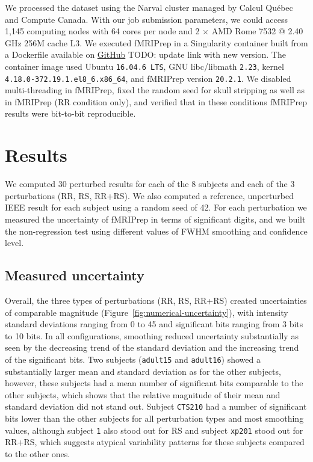 \documentclass{article}
\newcommand{\TODO}[1]{\color{red}\textsc{TODO:} #1\color{black}\xspace}
\newcommand{\fmriprep}{fMRIPrep \xspace}
\begin{document}
We processed the dataset using the Narval cluster managed by Calcul Qu\'ebec and
Compute Canada. With our job submission parameters, we could access 1,145
computing nodes with 64 cores per node and 2 $\times$ AMD Rome 7532 @ 2.40 GHz
256M cache L3. We executed \fmriprep in a Singularity container built from a
Dockerfile available on
\href{https://github.com/SIMEXP/fmriprep-reproducibility/blob/master/fmriprep-reproducibility/containers/Dockerfile}{GitHub}
\TODO{update link with new version}. The container image used Ubuntu \texttt{16.04.6 LTS}, GNU
libc/libmath \texttt{2.23}, kernel \texttt{4.18.0-372.19.1.el8\_6.x86\_64}, and fMRIPrep version \texttt{20.2.1}. We disabled
multi-threading in fMRIPrep, fixed the random seed for skull stripping as well
as in fMRIPrep (RR condition only), and verified that in these conditions
fMRIPrep results were bit-to-bit reproducible.

\section{Results}

We computed 30 perturbed results for each of the 8 subjects and each of the 3
perturbations (RR, RS, RR+RS). We also computed a reference, unperturbed IEEE
result for each subject using a random seed of 42. For each perturbation we
measured the uncertainty of fMRIPrep in terms of significant digits, and we
built the non-regression test using different values of FWHM smoothing and confidence level.

\subsection{Measured uncertainty}

Overall, the three types of perturbations (RR, RS, RR+RS) created uncertainties
of comparable magnitude (Figure~\ref{fig:numerical-uncertainty}), with intensity
standard deviations ranging from 0 to 45 and significant bits ranging from 3
bits to 10 bits. In all configurations, smoothing reduced uncertainty
substantially as seen by the decreasing trend of the standard deviation and the
increasing trend of the significant bits. Two subjects (\texttt{adult15} and
\texttt{adult16}) showed a substantially larger mean and standard deviation as
for the other subjects, however, these subjects had a mean number of significant
bits comparable to the other subjects, which shows that the relative magnitude
of their mean and standard deviation did not stand out. Subject \texttt{CTS210}
had a number of significant bits lower than the other subjects for all
perturbation types and most smoothing values, although subject \texttt{1} also
stood out for RS and subject \texttt{xp201} stood out for RR+RS, which suggests
atypical variability patterns for these subjects compared to the other ones.
\end{document}
